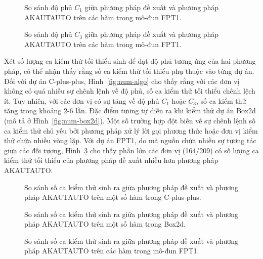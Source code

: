 \begin{figure}[H]
	\centering
	
	\caption{So sánh độ phủ $C_1$ giữa phương pháp đề xuất và phương pháp AKAUTAUTO trên các hàm trong mô-đun FPT1.}
	\label{fig:c1-serviceproxy}
\end{figure}

\begin{figure}[H]
	\centering
	
	\caption{So sánh độ phủ $C_3$ giữa phương pháp đề xuất và phương pháp AKAUTAUTO trên các hàm trong mô-đun FPT1.}
	\label{fig:c3-serviceproxy}
\end{figure}

Xét số lượng ca kiểm thử tối thiểu sinh để đạt độ phủ tương ứng của hai phương pháp, có thể nhận thấy rằng số ca kiểm thử tối thiểu phụ thuộc vào từng dự án. Đối với dự án C-plus-plus, Hình~\ref{fig:num-algo} cho thấy rằng với các đơn vị không có quá nhiều sự chênh lệnh về độ phủ, số ca kiểm thử tối thiểu chênh lệch ít. Tuy nhiên, với các đơn vị có sự tăng về độ phủ $C_1$ hoặc $C_3$, số ca kiểm thử tăng trong khoảng 2-6 lần. Đặc điểm tương tự diễn ra khi kiểm thử dự án Box2d (mô tả ở Hình~\ref{fig:num-box2d}). Một số trường hợp đột biến về sự chênh lệnh số ca kiểm thử chủ yếu bởi phương pháp xử lý lời gọi phương thức hoặc đơn vị kiểm thử chứa nhiều vòng lặp. Với dự án FPT1, do mã nguồn chứa nhiều sự tương tác giữa các đối tượng, Hình~\ref{fig:num-serviceproxy} cho thấy phần lớn các đơn vị (164/209) có số lượng ca kiểm thử tối thiểu của phương pháp đề xuất nhiều hơn phương pháp AKAUTAUTO.

\begin{figure}[H]
    \centering
    
    \caption{So sánh số ca kiểm thử sinh ra giữa phương pháp đề xuất và phương pháp AKAUTAUTO trên một số hàm trong C-plus-plus.}
    \label{fig:num-algo}
    
	
	\caption{So sánh số ca kiểm thử sinh ra giữa phương pháp đề xuất và phương pháp AKAUTAUTO trên một số hàm trong Box2d.}
	\label{fig:num-box2d}

	
	\caption{So sánh số ca kiểm thử sinh ra giữa phương pháp đề xuất và phương pháp AKAUTAUTO trên các hàm trong mô-đun FPT1.}
	\label{fig:num-serviceproxy}
\end{figure}

